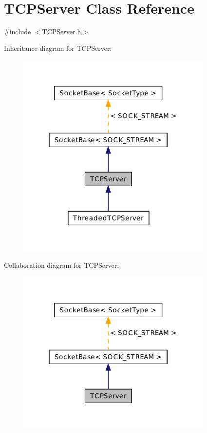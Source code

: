 \hypertarget{class_t_c_p_server}{\section{T\-C\-P\-Server Class Reference}
\label{class_t_c_p_server}
}


{\ttfamily \#include $<$T\-C\-P\-Server.\-h$>$}



Inheritance diagram for T\-C\-P\-Server\-:\nopagebreak
\begin{figure}[H]
\begin{center}
\leavevmode
\includegraphics[width=277pt]{class_t_c_p_server__inherit__graph}
\end{center}
\end{figure}


Collaboration diagram for T\-C\-P\-Server\-:\nopagebreak
\begin{figure}[H]
\begin{center}
\leavevmode
\includegraphics[width=277pt]{class_t_c_p_server__coll__graph}
\end{center}
\end{figure}
